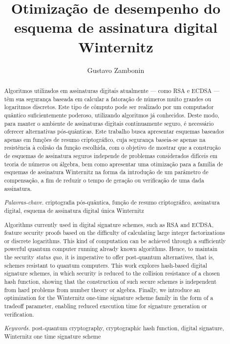 \documentclass[12pt,notitlepage]{report}
\title{
  Otimização de desempenho do esquema de assinatura digital Winternitz
}
\author{Gustavo Zambonin}
\date{}
\begin{document}
\maketitle

\begin{abstract}
Algoritmos utilizados em assinaturas digitais atualmente --- como RSA e ECDSA --- têm sua segurança baseada em calcular a fatoração de números muito grandes ou logaritmos discretos. Este tipo de cômputo pode ser realizado por um computador quântico suficientemente poderoso, utilizando algoritmos já conhecidos. Deste modo, para manter o ambiente de assinaturas digitais continuamente seguro, é necessário oferecer alternativas pós-quânticas. Este trabalho busca apresentar esquemas baseados apenas em funções de resumo criptográfico, cuja segurança baseia-se apenas na resistência à colisão da função escolhida, com o objetivo de mostrar que a construção de esquemas de assinatura seguros independe de problemas considerados difíceis em teoria de números ou álgebra, bem como apresentar uma otimização para a família de esquemas de assinatura Winternitz na forma da introdução de um parâmetro de compensação, a fim de reduzir o tempo de geração ou verificação de uma dada assinatura.

\emph{Palavras-chave.} criptografia pós-quântica, função de resumo criptográfico, assinatura digital, esquema de assinatura digital única Winternitz
\end{abstract}

\begin{otherlanguage}{english}
\begin{abstract}
Algorithms currently used in digital signature schemes, such as RSA and ECDSA,
feature security proofs based on the difficulty of calculating large integer
factorizations or discrete logarithms. This kind of computation can be achieved
through a sufficiently powerful quantum computer running already known algorithms.
Hence, to maintain the security \emph{status quo}, it is imperative to offer post-quantum
alternatives, that is, schemes resistant to quantum computers. This work explores
hash-based digital signature schemes, in which security is reduced to the collision
resistance of a chosen hash function, showing that the construction of such secure
schemes is independent from hard problems from number theory or algebra. Finally,
we introduce an optimization for the Winternitz one-time signature scheme family
in the form of a tradeoff parameter, enabling reduced execution time for signature
generation or verification.

\emph{Keywords.} post-quantum cryptography, cryptographic hash function,
digital signature, Winternitz one time signature scheme
\end{abstract}
\end{otherlanguage}
\end{document}
